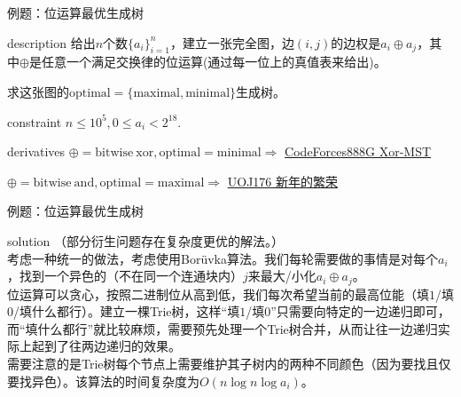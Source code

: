 \documentclass{beamer}
\def\le{\leqslant}
\begin{document}
\begin{frame}{例题：位运算最优生成树}
	\begin{block}{description}
		给出$n$个数$\{a_i\}_{i=1}^{n}$，建立一张完全图，边$(i, j)$的边权是$a_i \oplus a_j$，其中$\oplus$是任意一个满足交换律的位运算(通过每一位上的真值表来给出)。
		
		求这张图的$\mathrm{optimal = \{maximal, minimal\}}$生成树。
	\end{block}
	\begin{block}{constraint}
		$n \le 10^5, 0 \le a_i < 2^{18}.$
	\end{block}
	\begin{block}{derivatives}
		$\oplus = \mathrm{bitwise\ xor}, \mathrm{optimal = minimal} \Rightarrow $ \href{http://codeforces.com/problemset/problem/888/G}{CodeForces888G Xor-MST}
		
		$\oplus = \mathrm{bitwise\ and}, \mathrm{optimal = maximal} \Rightarrow $ \href{https://uoj.ac/problem/176}{UOJ176 新年的繁荣}
	\end{block}
\end{frame}
\begin{frame}{例题：位运算最优生成树}
	\begin{block}{solution}
		（部分衍生问题存在复杂度更优的解法。）\\
		
		考虑一种统一的做法，考虑使用Borüvka算法。我们每轮需要做的事情是对每个$a_i$，找到一个异色的（不在同一个连通块内）$j$来最大/小化$a_i \oplus a_j$。\\
		
		位运算可以贪心，按照二进制位从高到低，我们每次希望当前的最高位能（填$1$/填$0$/填什么都行）。建立一棵Trie树，这样“填$1$/填$0$”只需要向特定的一边递归即可，而“填什么都行”就比较麻烦，需要预先处理一个Trie树合并，从而让往一边递归实际上起到了往两边递归的效果。\\
		
		需要注意的是Trie树每个节点上需要维护其子树内的两种不同颜色（因为要找且仅要找异色）。该算法的时间复杂度为$O(n\log n\log a_i)$。
	\end{block}
\end{frame}
\end{document}
